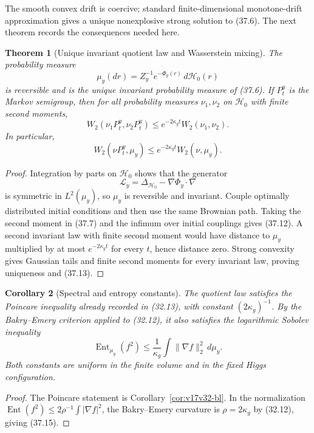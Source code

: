 \documentclass[11pt]{article}
\newtheorem{theorem}{Theorem}[section]
\newtheorem{corollary}[theorem]{Corollary}
\theoremstyle{remark}
\begin{document}
The smooth convex drift is coercive; standard finite-dimensional
monotone-drift approximation gives a unique nonexplosive strong solution
to (37.6).  The next theorem records the consequences needed here.

\begin{theorem}[Unique invariant quotient law and Wasserstein mixing]
\label{thm:v17v37-invariant}
The probability measure
\[
 \mu_y(dr)=Z_y^{-1}e^{-\Phi_y(r)}\,d\mathcal H_0(r)              \tag{37.11}
\]
is reversible and is the unique invariant probability measure of
(37.6).  If \(P_t^y\) is the Markov semigroup, then for all probability
measures \(\nu_1,\nu_2\) on \(\mathcal H_0\) with finite second moments,
\[
 \boxed{
 W_2(\nu_1P_t^y,\nu_2P_t^y)
 \leq e^{-2\kappa_gt}W_2(\nu_1,\nu_2).}           \tag{37.12}
\]
In particular,
\[
 W_2(\nu P_t^y,\mu_y)
 \leq e^{-2\kappa_gt}W_2(\nu,\mu_y).              \tag{37.13}
\]
\end{theorem}

\begin{proof}
Integration by parts on \(\mathcal H_0\) shows that the generator
\[
 \mathcal L_y=\Delta_{\mathcal H_0}
 -\nabla\Phi_y\cdot\nabla                         \tag{37.14}
\]
is symmetric in \(L^2(\mu_y)\), so \(\mu_y\) is reversible and
invariant.  Couple optimally distributed initial conditions and then
use the same Brownian path.  Taking the second moment in (37.7) and the
infimum over initial couplings gives (37.12).  A second invariant law
with finite second moment would have distance to \(\mu_y\) multiplied
by at most \(e^{-2\kappa_gt}\) for every \(t\), hence distance zero.
Strong convexity gives Gaussian tails and finite second moments for
every invariant law, proving uniqueness and (37.13).
\end{proof}

\begin{corollary}[Spectral and entropy constants]
\label{cor:v17v37-functional}
The quotient law satisfies the Poincare inequality already recorded in
(32.13), with constant \((2\kappa_g)^{-1}\).  By the
Bakry--Emery criterion applied to (32.12), it also satisfies the
logarithmic Sobolev inequality
\[
 \operatorname{Ent}_{\mu_y}(f^2)
 \leq\frac1{\kappa_g}
 \int\|\nabla f\|_2^2\,d\mu_y.                    \tag{37.15}
\]
Both constants are uniform in the finite volume and in the fixed Higgs
configuration.
\end{corollary}

\begin{proof}
The Poincare statement is Corollary~\ref{cor:v17v32-bl}.  In the
normalization
\(\operatorname{Ent}(f^2)\leq2\rho^{-1}\int|\nabla f|^2\), the
Bakry--Emery curvature is \(\rho=2\kappa_g\) by (32.12), giving
(37.15).
\end{proof}
\end{document}
